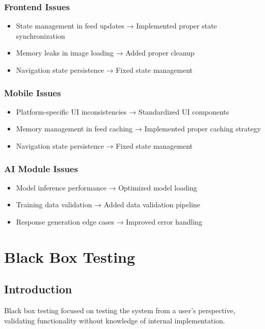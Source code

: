 \subsubsection{Frontend Issues}
\begin{itemize}
    \item State management in feed updates → Implemented proper state synchronization
    \item Memory leaks in image loading → Added proper cleanup
    \item Navigation state persistence → Fixed state management
\end{itemize}

\subsubsection{Mobile Issues}
\begin{itemize}
    \item Platform-specific UI inconsistencies → Standardized UI components
    \item Memory management in feed caching → Implemented proper caching strategy
    \item Navigation state persistence → Fixed state management
\end{itemize}

\subsubsection{AI Module Issues}
\begin{itemize}
    \item Model inference performance → Optimized model loading
    \item Training data validation → Added data validation pipeline
    \item Response generation edge cases → Improved error handling
\end{itemize}

\section{Black Box Testing}

\subsection{Introduction}
Black box testing focused on testing the system from a user's perspective, validating functionality without knowledge of internal implementation.

